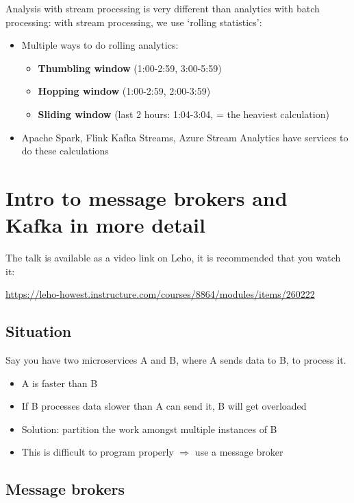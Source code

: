\documentclass{article}
\begin{document}
Analysis with stream processing is very different than analytics with batch processing: 
with stream processing, we use `rolling statistics':

\begin{itemize}
    \item Multiple ways to do rolling analytics:
    \begin{itemize}
        \item \textbf{Thumbling window} (1:00-2:59, 3:00-5:59)
        \item \textbf{Hopping window} (1:00-2:59, 2:00-3:59)
        \item \textbf{Sliding window} (last 2 hours: 1:04-3:04, = the heaviest calculation)
    \end{itemize}
    \item Apache Spark, Flink Kafka Streams, Azure Stream Analytics have services to do these calculations
\end{itemize}

\section{Intro to message brokers and Kafka in more detail}

The talk is available as a video link on Leho, it is recommended that you watch it:

\url{https://leho-howest.instructure.com/courses/8864/modules/items/260222}

\subsection{Situation}

Say you have two microservices A and B, where A sends data to B, to process it.

\begin{itemize}
    \item A is faster than B
    \item If B processes data slower than A can send it, B will get overloaded
    \item Solution: partition the work amongst multiple instances of B
    \item This is difficult to program properly $\Rightarrow$ use a message broker 
\end{itemize}

\subsection{Message brokers}
\end{document}
